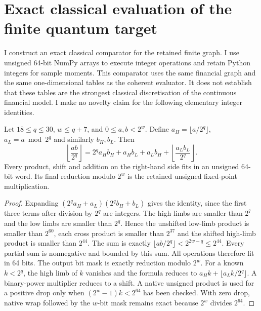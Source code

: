 \section{Exact classical evaluation of the finite quantum target}
\label{sec:exactclassical}

I construct an exact classical comparator for the retained finite graph. I use
unsigned 64-bit NumPy arrays to execute integer operations and retain Python
integers for sample moments. This comparator uses the same financial graph
and the same one-dimensional tables as the coherent evaluator. It does not
establish that these tables are the strongest classical discretisation of the
continuous financial model. I make no novelty claim for the following
elementary integer identities.

\begin{lemma}
Let $18\leq q\leq30$, $w\leq q+7$, and $0\leq a,b<2^w$. Define
$a_H=\lfloor a/2^q\rfloor$, $a_L=a\bmod2^q$ and similarly $b_H,b_L$.
Then
\[
 \left\lfloor\frac{ab}{2^q}\right\rfloor
 =2^q a_Hb_H+a_Hb_L+a_Lb_H
   +\left\lfloor\frac{a_Lb_L}{2^q}\right\rfloor .
\]
Every product, shift and addition on the right-hand side fits in an unsigned
64-bit word. Its final reduction modulo $2^w$ is the retained unsigned
fixed-point multiplication.
\end{lemma}
\begin{proof}
Expanding $(2^q a_H+a_L)(2^q b_H+b_L)$ gives the identity, since the first
three terms after division by $2^q$ are integers. The high limbs are smaller
than $2^7$ and the low limbs are smaller than $2^q$. Hence the unshifted
low-limb product is smaller than $2^{60}$, each cross product is smaller than
$2^{37}$ and the shifted high-limb product is smaller than $2^{44}$.
The sum is exactly $\lfloor ab/2^q\rfloor<2^{2w-q}\leq2^{44}$.
Every partial sum is nonnegative and bounded by this sum. All operations
therefore fit in 64 bits. The output bit mask is exactly reduction modulo
$2^w$. For a known $k<2^q$, the high limb of $k$ vanishes and the formula
reduces to $a_Hk+\lfloor a_Lk/2^q\rfloor$. A binary-power multiplier reduces
to a shift. A native unsigned product is used for a positive drop only when
$(2^w-1)k<2^{64}$ has been checked. With zero drop, native wrap followed by
the $w$-bit mask remains exact because $2^w$ divides $2^{64}$.
\end{proof}

